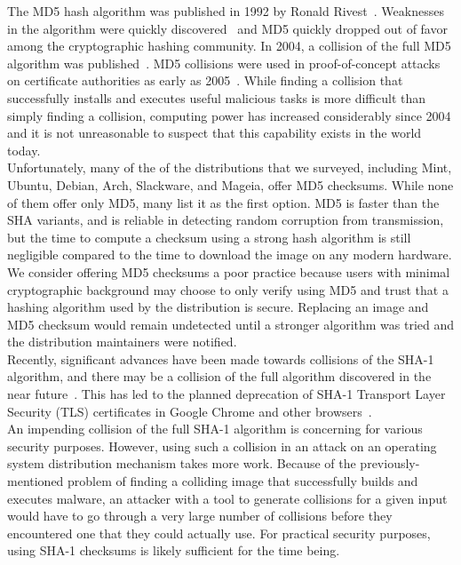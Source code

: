 \documentclass[conference]{IEEEtran}
\begin{document}
The MD5 hash algorithm was published in 1992 by Ronald Rivest~\cite{rivest1992md5}. Weaknesses
in the algorithm were quickly discovered~\cite{md51993} and MD5 quickly dropped out of favor
among the cryptographic hashing community. In 2004, a collision of the full MD5 algorithm was
published~\cite{wang2004collisions}. MD5 collisions were used in proof-of-concept attacks on
certificate authorities as early as 2005~\cite{md5attack}. While finding a collision that
successfully installs and executes useful malicious tasks is more difficult than simply finding
a collision, computing power has increased considerably since 2004 and it is not unreasonable
to suspect that this capability exists in the world today.\\
\indent Unfortunately, many of the of the distributions that we surveyed, including Mint,
Ubuntu, Debian, Arch, Slackware, and Mageia, offer MD5 checksums. While none of them offer
only MD5, many list it as the first option. MD5 is faster than the SHA variants, and is
reliable in detecting random corruption from transmission, but the time to compute a checksum
using a strong hash algorithm is still negligible compared to the time to download the image
on any modern hardware. We consider offering MD5 checksums a poor practice because users with
minimal cryptographic background may choose to only verify using MD5 and trust that a hashing
algorithm used by the distribution is secure. Replacing an image and MD5 checksum would remain
undetected until a stronger algorithm was tried and the distribution maintainers were notified.\\
\indent Recently, significant advances have been made towards collisions of the SHA-1
algorithm, and there may be a collision of the full algorithm discovered in the near
future~\cite{stevens2015freestart}. This has led to the planned deprecation of SHA-1
Transport Layer Security (TLS) certificates in Google Chrome and other
browsers~\cite{chromesha1}.\\
\indent An impending collision of the full SHA-1 algorithm is concerning for various security
purposes. However, using such a collision in an attack on an operating system distribution
mechanism takes more work. Because of the previously-mentioned problem of finding a
colliding image that successfully builds and executes malware, an attacker with a tool to generate
collisions for a given input would have to go through a very large number of collisions before
they encountered one that they could actually use. For practical security purposes, using SHA-1
checksums is likely sufficient for the time being.
\end{document}
